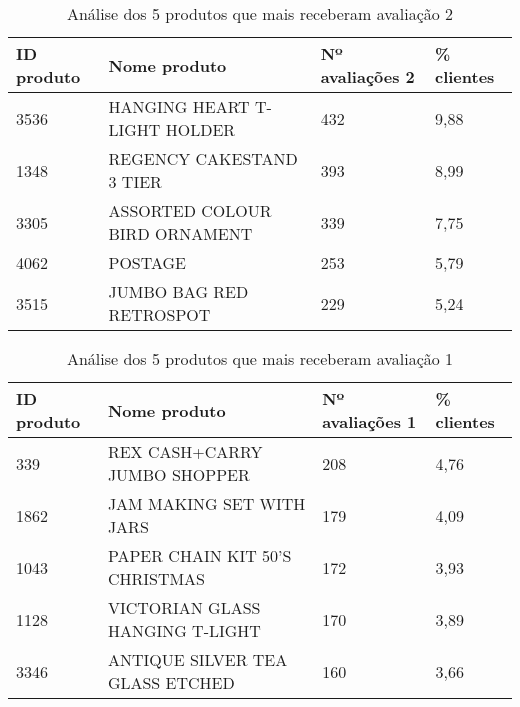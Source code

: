 \begin{table}[ht]
\centering
\begin{tabular}{@{}llll@{}}
\toprule
\textbf{ID produto} & \textbf{Nome produto}         & \textbf{Nº avaliações 2} & \textbf{\% clientes} \\ \midrule
3536       & HANGING HEART T-LIGHT HOLDER & 432                  & 9,88               \\
1348       & REGENCY CAKESTAND 3 TIER           & 393                  & 8,99               \\
3305       & ASSORTED COLOUR BIRD ORNAMENT      & 339                  & 7,75               \\
4062       & POSTAGE                            & 253                  & 5,79               \\
3515       & JUMBO BAG RED RETROSPOT            & 229                  & 5,24               \\ \bottomrule
\end{tabular}
\caption{Análise dos 5 produtos que mais receberam avaliação 2}
\label{tab:a2}
\end{table}
\vspace{1cm}

\begin{table}[ht]
\centering
\begin{tabular}{@{}llll@{}}
\toprule
\textbf{ID produto} & \textbf{Nome produto}         & \textbf{Nº avaliações 1} & \textbf{\% clientes} \\ \midrule
339        & REX CASH+CARRY JUMBO SHOPPER    & 208                  & 4,76               \\
1862       & JAM MAKING SET WITH JARS        & 179                  & 4,09               \\
1043       & PAPER CHAIN KIT 50'S CHRISTMAS  & 172                  & 3,93               \\
1128       & VICTORIAN GLASS HANGING T-LIGHT & 170                  & 3,89               \\
3346       & ANTIQUE SILVER TEA GLASS ETCHED & 160                  & 3,66               \\ \bottomrule
\end{tabular}
\caption{Análise dos 5 produtos que mais receberam avaliação 1}
\label{tab:a1}
\end{table}
\vspace{1cm}